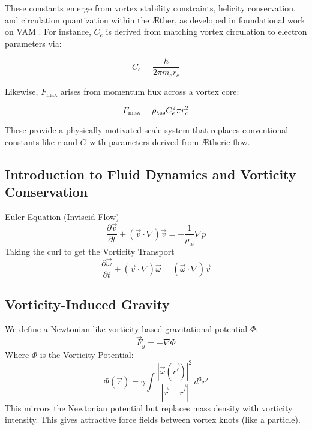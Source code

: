 \documentclass[aps,preprint,superscriptaddress]{revtex4}
\begin{document}
These constants emerge from vortex stability constraints, helicity conservation, and circulation quantization within the Æther, as developed in foundational work on VAM \cite{vam2025field, vam2025unified}. For instance, $C_e$ is derived from matching vortex circulation to electron parameters via:

\[
    C_e = \frac{h}{2\pi m_e r_c}
\]

Likewise, $F_{\text{max}}$ arises from momentum flux across a vortex core:

\[
    F_{\text{max}} = \rho_{\ae} C_e^2 \pi r_c^2
\]

These provide a physically motivated scale system that replaces conventional constants like $c$ and $G$ with parameters derived from Ætheric flow.


\subsection*{Introduction to Fluid Dynamics and Vorticity Conservation}
    Euler Equation (Inviscid Flow)
    \begin{equation}
        \frac{\partial \vec{v}}{\partial t} + (\vec{v} \cdot \nabla)\vec{v} = -\frac{1}{\rho_\text{æ}} \nabla p
    \end{equation}
    Taking the curl to get the Vorticity Transport
    \begin{equation}
        \frac{\partial \vec{\omega}}{\partial t} + (\vec{v} \cdot \nabla)\vec{\omega} = (\vec{\omega} \cdot \nabla) \vec{v}
    \end{equation}

    \subsection*{Vorticity-Induced Gravity}
    We define a Newtonian like vorticity-based gravitational potential $\Phi$:
    \begin{equation}
        \vec{F}_g = -\nabla \Phi
    \end{equation}
    Where $\Phi$ is the Vorticity Potential:
    \begin{equation}
        \Phi(\vec{r}) = \gamma \int \frac{|\vec{\omega}(\vec{r'})|^2}{|\vec{r} - \vec{r'}|} \, d^3r'
    \end{equation}
    This mirrors the Newtonian potential but replaces mass density with vorticity intensity. This gives attractive force fields between vortex knots (like a particle).
\end{document}
